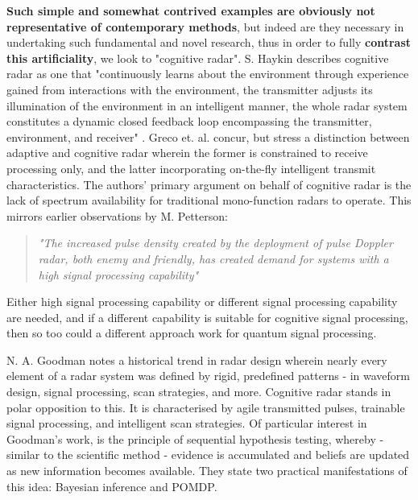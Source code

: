\textbf{Such simple and somewhat contrived examples are obviously not representative of contemporary methods}, but indeed are they necessary in undertaking such fundamental and novel research, thus in order to fully \textbf{contrast this artificiality}, we look to "cognitive radar".
S. Haykin describes cognitive radar as one that "continuously learns about the environment through experience gained from interactions with the environment, the transmitter adjusts its illumination of the environment in an intelligent manner, the whole radar system constitutes a dynamic closed feedback loop encompassing the transmitter, environment, and receiver" \cite{haykin_cognitive_2006}.
Greco et. al. \cite{greco_cognitive_nodate} concur, but stress a distinction between adaptive and cognitive radar wherein the former is constrained to receive processing only, and the latter incorporating on-the-fly intelligent transmit characteristics.
The authors' primary argument on behalf of cognitive radar is the lack of spectrum availability for traditional mono-function radars to operate.
This mirrors earlier observations by M. Petterson:
\begin{quote}
    \textit{"The increased pulse density created by the deployment of pulse Doppler radar, both enemy and friendly, has created demand for systems with a high signal processing capability"}  \cite[p. 42]{pettersson_illustrated_1992}
\end{quote}
Either high signal processing capability or different signal processing capability are needed, and if a different capability is suitable for cognitive signal processing, then so too could a different approach work for quantum signal processing.


N. A. Goodman \cite{goodman_chapter_2018} notes a historical trend in radar design wherein nearly every element of a radar system was defined by rigid, predefined patterns - in waveform design, signal processing, scan strategies, and more.
Cognitive radar stands in polar opposition to this.
It is characterised by agile transmitted pulses, trainable signal processing, and intelligent scan strategies. 
Of particular interest in Goodman's work, is the principle of sequential hypothesis testing, whereby - similar to the scientific method - evidence is accumulated and beliefs are updated as new information becomes available.
They state two practical manifestations of this idea: Bayesian inference and \ac{POMDP}.

